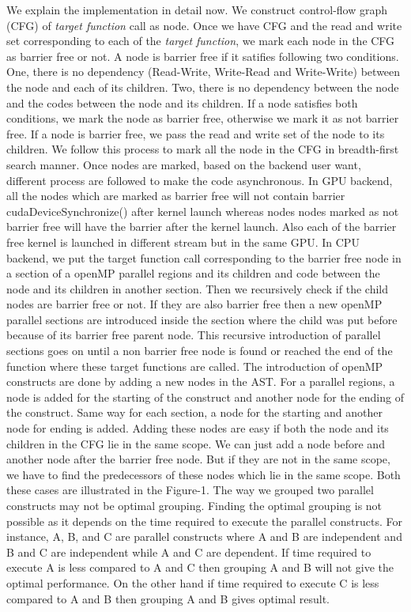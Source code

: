 \documentclass[12pt]{article}
\begin{document}
We explain the implementation in detail now. 
We construct control-flow graph (CFG) of \textit{target function} call as node.
Once we have CFG and the read and write set corresponding to each of the \textit{target function}, we mark each node in the CFG as barrier free or not.
A node is barrier free if it satifies following two conditions.
One, there is no dependency (Read-Write, Write-Read and Write-Write) between the node and each of its children. Two, there is no dependency between the node and the codes between the node and its children.
If a node satisfies both conditions, we mark the node as barrier free, otherwise we mark it as not barrier free.
If a node is barrier free, we pass the read and write set of the node to its children.
We follow this process to mark all the node in the CFG in breadth-first search manner.
Once nodes are marked, based on the backend user want, different process are followed to make the code asynchronous.
In GPU backend, all the nodes which are marked as barrier free will not contain barrier cudaDeviceSynchronize() after kernel launch whereas nodes nodes marked as not barrier free will have the barrier after the kernel launch. Also each of the barrier free kernel is launched in different stream but in the same GPU.
In CPU backend, we put the target function call corresponding to the barrier free node in a section of a openMP parallel regions and its children and code between the node and its children in another section. Then we recursively check if the child nodes are barrier free or not. If they are also barrier free then a new openMP parallel sections are introduced inside the section where the child was put before because of its barrier free parent node. This recursive introduction of parallel sections goes on until a non barrier free node is found or reached the end of the function where these target functions are called. The introduction of openMP constructs are done by adding a new nodes in the AST. For a parallel regions, a node is added for the starting of the construct and another node for the ending of the construct. Same way for each section, a node for the starting and another node for ending is added. Adding these nodes are easy if both the node and its children in the CFG lie in the same scope. We can just add a node before and another node after the barrier free node. But if they are not in the same scope, we have to find the predecessors of these nodes which lie in the same scope. Both these cases are illustrated in the Figure-1.
The way we grouped two parallel constructs may not be optimal grouping. Finding the optimal grouping is not possible as it depends on the time required to execute the parallel constructs. For instance, A, B, and C are parallel constructs where A and B are independent and B and C are independent while A and C are dependent. If time required to execute A is less compared to A and C then grouping A and B will not give the optimal performance. On the other hand if time required to execute C is less compared to A and B then grouping A and B gives optimal result.
\end{document}
